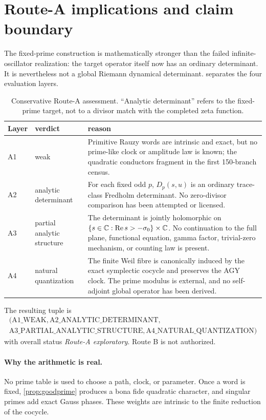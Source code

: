 \section{Route-A implications and claim boundary}
\label{sec:routea}

The fixed-prime construction is mathematically stronger than the failed
infinite-oscillator realization: the target operator itself now has an
ordinary determinant.  It is nevertheless not a global Riemann dynamical
determinant.   separates the four evaluation layers.

\begin{table}[ht]
\centering
\caption{Conservative Route-A assessment.  ``Analytic determinant'' refers
to the fixed-prime target, not to a divisor match with the completed zeta
function.}
\label{tab:routea}
\begin{tabular}{p{}p{}p{}}
\toprule
Layer & verdict & reason\\
\midrule
A1 & weak & Primitive Rauzy words are intrinsic and exact, but no prime-like
clock or amplitude law is known; the quadratic conductors fragment in the
first 150-branch census.\\
A2 & analytic determinant & For each fixed odd \(p\), \(D_p(s,u)\) is an
ordinary trace-class Fredholm determinant.  No zero-divisor comparison has
been attempted or licensed.\\
A3 & partial analytic structure & The determinant is jointly holomorphic on
\(\{s\in\mathbb{C}:\operatorname{Re}s>-\sigma_0\}\times\mathbb{C}\).  No continuation to the full plane, functional
equation, gamma factor, trivial-zero mechanism, or counting law is present.\\
A4 & natural quantization & The finite Weil fibre is canonically induced by
the exact symplectic cocycle and preserves the AGY clock.  The prime modulus
is external, and no self-adjoint global operator has been derived.\\
\bottomrule
\end{tabular}
\end{table}

The resulting tuple is
\[
\begin{gathered}
(\mathrm{A1\_WEAK},\mathrm{A2\_ANALYTIC\_DETERMINANT},\\
\mathrm{A3\_PARTIAL\_ANALYTIC\_STRUCTURE},
\mathrm{A4\_NATURAL\_QUANTIZATION})
\end{gathered}
\]
with overall status \emph{Route-A exploratory}.  Route B is not authorized.

\paragraph{Why the arithmetic is real.}
No prime table is used to choose a path, clock, or parameter.  Once a word is
fixed, \cref{prop:goodprime} produces a bona fide quadratic character, and
singular primes add exact Gauss phases.  These weights are intrinsic to the
finite reduction of the cocycle.

